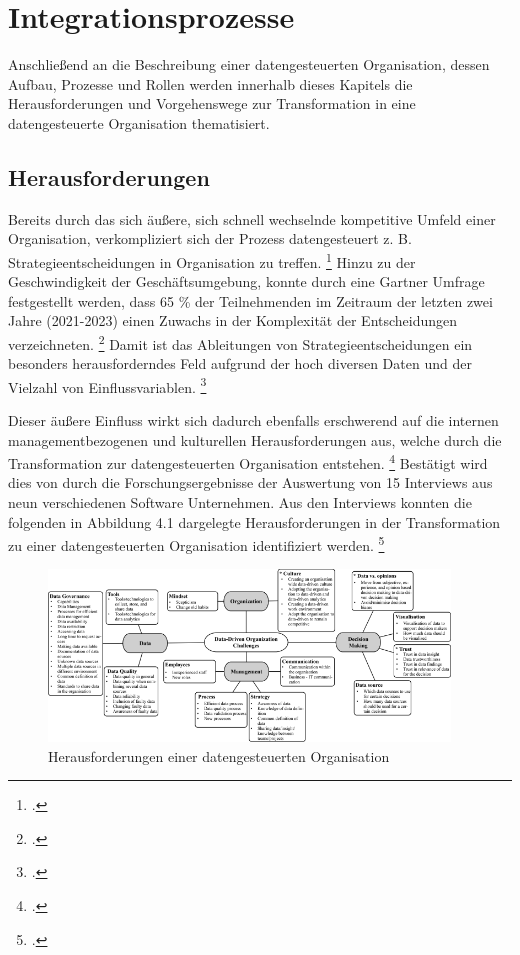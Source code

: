 \chapter[Integrationsprozesse]{Integrationsprozesse}

Anschließend an die Beschreibung einer datengesteuerten Organisation, dessen Aufbau, Prozesse und Rollen werden innerhalb dieses Kapitels die Herausforderungen und Vorgehenswege zur Transformation in eine datengesteuerte Organisation thematisiert.

\section{Herausforderungen}

Bereits durch das sich äußere, sich schnell wechselnde kompetitive Umfeld einer Organisation, verkompliziert sich der Prozess datengesteuert z. B. Strategieentscheidungen in Organisation zu treffen. \footcite[Vgl.][S. 2]{Pratt.2023} 
Hinzu zu der Geschwindigkeit der Geschäftsumgebung, konnte durch eine Gartner Umfrage festgestellt werden, dass 65 \% der Teilnehmenden im Zeitraum der letzten zwei Jahre (2021-2023) einen Zuwachs in der Komplexität der Entscheidungen verzeichneten. \footcite[Vgl.][S. 65]{Pratt.2023}
Damit ist das Ableitungen von Strategieentscheidungen ein besonders herausforderndes Feld aufgrund der hoch diversen Daten und der Vielzahl von Einflussvariablen. \footcite[Vgl.][S. 3]{Pratt.2023}

Dieser äußere Einfluss wirkt sich dadurch ebenfalls erschwerend auf die internen managementbezogenen und kulturellen Herausforderungen aus, welche durch die Transformation zur datengesteuerten Organisation entstehen. \footcite[Vgl.][S. 15]{Dalpiaz.2020}
Bestätigt wird dies von  durch die Forschungsergebnisse der Auswertung von 15 Interviews aus neun verschiedenen Software Unternehmen.
Aus den Interviews konnten die folgenden in Abbildung 4.1 dargelegte Herausforderungen in der Transformation zu einer datengesteuerten Organisation identifiziert werden. \footcite[][S. 9]{Dalpiaz.2020}

\begin{figure}[htb]
    \centering
    \includegraphics[width=0.95\textwidth]{graphics/DDO challenges.png}
    \caption{Herausforderungen einer datengesteuerten Organisation}
    \label{fig:DDOs challenges}
\end{figure}

